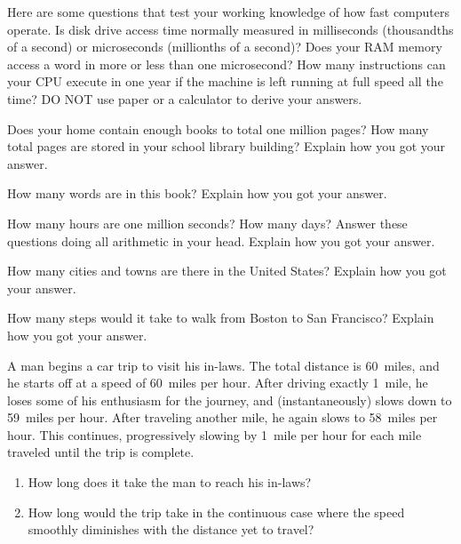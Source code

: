 \begin{exercises}
\item
Here are some questions that test your working knowledge of how fast
computers operate.
Is disk drive access time normally measured in milliseconds
(thousandths of a second) or microseconds (millionths of a second)?
Does your RAM memory access a word in more or less than one
microsecond?
How many instructions can your CPU execute in one year if the machine
is left running at full speed all the time?
DO NOT use paper or a calculator to derive your answers.

\item
Does your home contain enough books to total one million
pages?
How many total pages are stored in your school library building?
Explain how you got your answer.

\item
How many words are in this book?
Explain how you got your answer.

\item
How many hours are one million seconds?
How many days?
Answer these questions doing all arithmetic in your head.
Explain how you got your answer.

\item
How many cities and towns are there in the United
States?
Explain how you got your answer.

\item
How many steps would it take to walk from Boston to
San Francisco?
Explain how you got your answer.

\item
A man begins a car trip to visit his in-laws.
The total distance is 60~miles, and he starts off at a speed of
60~miles per hour.
After driving exactly 1~mile, he loses some of his enthusiasm for
the journey, and (instantaneously) slows down to 59~miles per hour.
After traveling another mile, he again slows to 58~miles per hour.
This continues, progressively slowing by 1~mile per hour
for each mile traveled until the trip is complete.

\begin{enumerate}
\item How long does it take the man to reach his in-laws?

\item How long would the trip take in the continuous case where
the speed smoothly diminishes with the distance yet to travel?
\end{enumerate}

\end{exercises}
